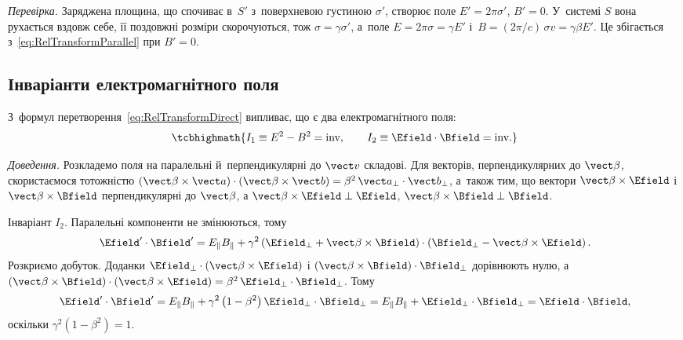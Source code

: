 \emph{Перевірка.} Заряджена площина, що спочиває в~$S'$ з~поверхневою густиною $\sigma'$, створює
поле $E' = 2\pi\sigma'$, $B' = 0$. У~системі $S$ вона рухається вздовж себе, її поздовжні розміри
скорочуються, тож $\sigma = \gamma\sigma'$, а~поле $E = 2\pi\sigma = \gamma E'$ і~$B = (2\pi/c)\,\sigma v =
\gamma\beta E'$. Це збігається з~\eqref{eq:RelTransformParallel} при $B' = 0$.

\subsection*{Інваріанти електромагнітного поля}

З~формул перетворення~\eqref{eq:RelTransformDirect} випливає, що є два 
електромагнітного поля:
\begin{equation}\label{eq:FieldInvariants}
	\tcbhighmath{ I_1 \equiv E^2 - B^2 = \text{inv}, \qquad I_2 \equiv \Efield\cdot\Bfield
	= \text{inv}. }
\end{equation}

\emph{Доведення.} Розкладемо поля на паралельні й~перпендикулярні до $\vect v$ складові.
Для векторів, перпендикулярних до $\vect\beta$, скористаємося тотожністю
$(\vect\beta\times\vect a)\cdot(\vect\beta\times\vect b) = \beta^2\,\vect
a_\perp\cdot\vect b_\perp$, а~також тим, що вектори $\vect\beta\times\Efield$ і
$\vect\beta\times\Bfield$ перпендикулярні до $\vect\beta$, а
$\vect\beta\times\Efield\perp\Efield$, $\vect\beta\times\Bfield\perp\Bfield$.

Інваріант $I_2$. Паралельні компоненти не змінюються, тому
\begin{equation*}
	\Efield'\cdot\Bfield' = E_\parallel B_\parallel + \gamma^2\left(\Efield_\perp +
	\vect\beta\times\Bfield\right)\cdot\left(\Bfield_\perp -
	\vect\beta\times\Efield\right).
\end{equation*}
Розкриємо добуток. Доданки $\Efield_\perp\cdot(\vect\beta\times\Efield)$ і
$(\vect\beta\times\Bfield)\cdot\Bfield_\perp$ дорівнюють нулю, а
$(\vect\beta\times\Bfield)\cdot(\vect\beta\times\Efield) =
\beta^2\,\Efield_\perp\cdot\Bfield_\perp$. Тому
\begin{equation*}
	\Efield'\cdot\Bfield' = E_\parallel B_\parallel +
	\gamma^2\left(1-\beta^2\right)\Efield_\perp\cdot\Bfield_\perp = E_\parallel
	B_\parallel + \Efield_\perp\cdot\Bfield_\perp = \Efield\cdot\Bfield,
\end{equation*}
оскільки $\gamma^2(1-\beta^2) = 1$.

